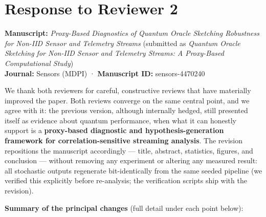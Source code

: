 \documentclass[
  11pt,
]{article}
\author{}
\date{}
\begin{document}
\section{Response to Reviewer 2}\label{response-to-reviewer-2}

\textbf{Manuscript:} \emph{Proxy-Based Diagnostics of Quantum Oracle
Sketching Robustness for Non-IID Sensor and Telemetry Streams}
(submitted as \emph{Quantum Oracle Sketching for Non-IID Sensor and
Telemetry Streams: A Proxy-Based Computational Study})\\
\textbf{Journal:} Sensors (MDPI) · \textbf{Manuscript ID:}
sensors-4470240

We thank both reviewers for careful, constructive reviews that have
materially improved the paper. Both reviews converge on the same central
point, and we agree with it: the previous version, although internally
hedged, still presented itself as evidence about quantum performance,
when what it can honestly support is a \textbf{proxy-based diagnostic
and hypothesis-generation framework for correlation-sensitive streaming
analysis}. The revision repositions the manuscript accordingly ---
title, abstract, statistics, figures, and conclusion --- without
removing any experiment or altering any measured result: all stochastic
outputs regenerate bit-identically from the same seeded pipeline (we
verified this explicitly before re-analysis; the verification scripts
ship with the revision).

\textbf{Summary of the principal changes} (full detail under each point
below):
\end{document}
